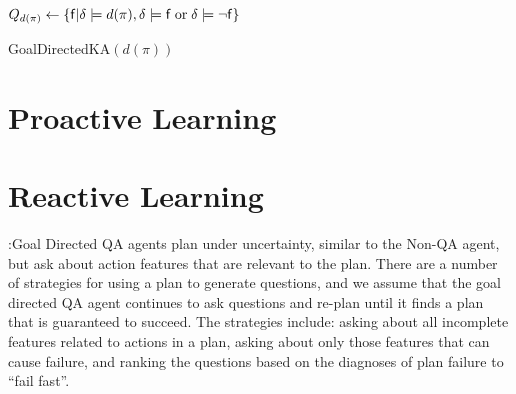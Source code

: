 \documentclass[letterpaper]{article}
\def\und#1{\noindent{\bf #1}:}
\begin{document}
\begin{algorithm}[t]
\SetLine
{}

$Q_{d(\pi)} \leftarrow \{{\sf f} | \delta \models d(\pi)
, \delta \models {\sf f} \;\text{or}\; \delta \models \neg{\sf f}\}$\;
\caption{GoalDirectedKA$(d(\pi))$}\label{alg:goaldirected}
\end{algorithm}


\section{Proactive Learning}

\section{Reactive Learning}

\und{Goal Directed QA}Goal Directed QA agents plan under uncertainty, similar to
the Non-QA agent, but ask about action features that are relevant to the plan.
There are a number of strategies for using a plan to generate questions, and we assume
that the goal directed QA agent continues to ask questions and re-plan until it
finds a plan that is guaranteed to succeed. The strategies include: asking about
all incomplete features related to actions in a plan, asking about only those
features that can cause failure, and ranking the questions based on the
diagnoses of plan failure to ``fail fast''.

% 
% 
\end{document}
